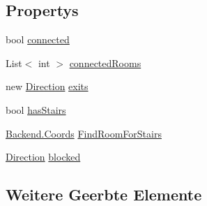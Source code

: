 \subsection*{Propertys}
\begin{DoxyCompactItemize}
\item 
bool \hyperlink{class_gruppe22_1_1_backend_1_1_generator_a78432433649cd8d0c4f2dc1c49c6821f}{connected}
\item 
List$<$ int $>$ \hyperlink{class_gruppe22_1_1_backend_1_1_generator_a4d4db744aab453a9ad1317fc280f80a0}{connected\-Rooms}
\item 
new \hyperlink{namespace_gruppe22_1_1_backend_a2d53d5d14b8ea0951ba6971e5da1ebf5}{Direction} \hyperlink{class_gruppe22_1_1_backend_1_1_generator_a08c85796fec36eaf888e0c2d8af5cb64}{exits}
\item 
bool \hyperlink{class_gruppe22_1_1_backend_1_1_generator_acd434164e04bd866a5130d6333cc9b62}{has\-Stairs}
\item 
\hyperlink{class_gruppe22_1_1_backend_1_1_coords}{Backend.\-Coords} \hyperlink{class_gruppe22_1_1_backend_1_1_generator_a906ef2c015d9023394368b450dabbcdc}{Find\-Room\-For\-Stairs}
\item 
\hyperlink{namespace_gruppe22_1_1_backend_a2d53d5d14b8ea0951ba6971e5da1ebf5}{Direction} \hyperlink{class_gruppe22_1_1_backend_1_1_generator_ae8a5091874b204ac692ce85ec56b495a}{blocked}
\end{DoxyCompactItemize}
\subsection*{Weitere Geerbte Elemente}


